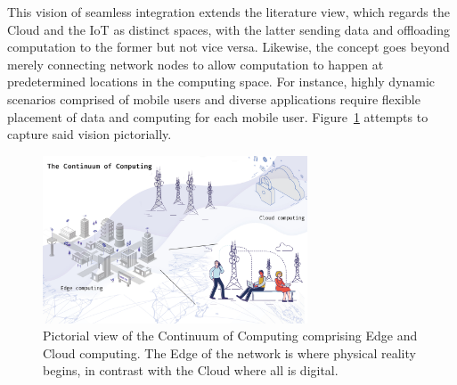 This vision of seamless integration extends the literature view, which regards the Cloud and the IoT as distinct spaces, with the latter sending data and offloading computation to the former but not vice versa. Likewise, the concept goes beyond merely connecting network nodes to allow computation to happen at predetermined locations in the computing space. For instance, highly dynamic scenarios comprised of mobile users and diverse applications require flexible placement of data and computing for each mobile user. Figure~\ref{fig:continuum} attempts to capture said vision pictorially. 

\begin{figure}[ht]
\centering
\includegraphics[width=0.7\textwidth]{figures/continuum}
\caption{Pictorial view of the Continuum of Computing comprising Edge and Cloud computing. The Edge of the network is where physical reality begins, in contrast with the Cloud where all is digital.}
\label{fig:continuum}
\end{figure}


